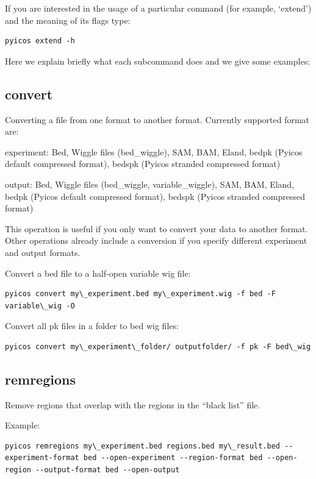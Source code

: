 \documentclass[letterpaper,10pt,english]{sphinxmanual}
\begin{document}
If you are interested in the usage of a particular command (for example, `extend') and the meaning of its flags type:

\begin{Verbatim}[commandchars=\\\{\}]
pyicos extend -h
\end{Verbatim}

Here we explain briefly what each subcommand does and we give some examples:


\subsection{convert}
\label{pyicos:convert}
Converting a file from one format to another format. Currently supported format are:

experiment: Bed, Wiggle files (bed\_wiggle), SAM, BAM, Eland, bedpk (Pyicos default compressed format), bedspk (Pyicos stranded compressed format)

output: Bed, Wiggle files (bed\_wiggle, variable\_wiggle), SAM, BAM, Eland, bedpk (Pyicos default compressed format), bedspk (Pyicos stranded compressed format)

This operation is useful if you only want to convert your data to another format. Other operations already include a conversion if you specify different experiment and output formats.

Convert a bed file to a half-open variable wig file:

\begin{Verbatim}[commandchars=\\\{\}]
pyicos convert my\_experiment.bed my\_experiment.wig -f bed -F variable\_wig -O
\end{Verbatim}

Convert all pk files in a folder to bed wig files:

\begin{Verbatim}[commandchars=\\\{\}]
pyicos convert my\_experiment\_folder/ outputfolder/ -f pk -F bed\_wig
\end{Verbatim}


\subsection{remregions}
\label{pyicos:remregions}
Remove regions that overlap with the regions in the ``black list'' file.

Example:

\begin{Verbatim}[commandchars=\\\{\}]
pyicos remregions my\_experiment.bed regions.bed my\_result.bed --experiment-format bed --open-experiment --region-format bed --open-region --output-format bed --open-output
\end{Verbatim}
\end{document}
